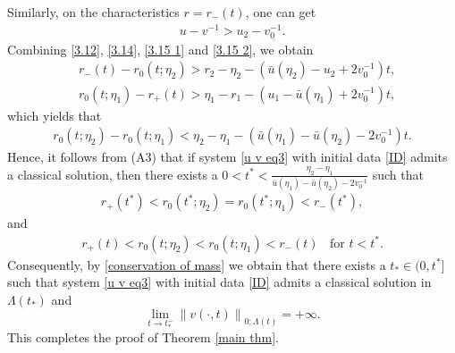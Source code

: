 \documentclass[10pt,leqno]{amsart}
\numberwithin{equation}{section}
\begin{document}
	Similarly, on the characteristics $r=r_{-}(t)$, one can get
	\begin{equation} \label{3.15 2}
		\begin{aligned}
			u-v^{-1}>u_2-v^{-1}_0.			 
		\end{aligned}
	\end{equation}
	Combining \eqref{3.12}, \eqref{3.14}, \eqref{3.15 1} and \eqref{3.15 2}, we obtain
	\begin{equation} 
		\begin{aligned}
			& r_{-}(t) - r_{0}(t;\eta_2) > r_{2}-\eta_2-( \bar{u} (\eta_2) - u_2 + 2v^{-1}_{0} ) t, \\
			& r_{0}(t;\eta_1)-r_{+}(t) > \eta_1-r_{1}-( u_1 - \bar{u} (\eta_1)  + 2v^{-1}_{0} ) t,
		\end{aligned}
	\end{equation}	
	which yields that
	\begin{equation} 
		\begin{aligned}
			r_{0}(t;\eta_2) - r_{0}(t;\eta_1) < \eta_2-\eta_1 - (\bar{u} (\eta_1) - \bar{u} (\eta_2)-2v^{-1}_{0})t .
		\end{aligned}
	\end{equation}	
	Hence, it follows from (A3) that if system \eqref{u v eq3} with initial data \eqref{ID} admits a classical solution, then there exists a $0<t^{*}<\frac{\eta_2-\eta_1 }{\bar{u} (\eta_1) - \bar{u} (\eta_2)-2v^{-1}_{0}}$ such that 
	\begin{equation*} 
		\begin{aligned}
			r_{+}(t^{*}) < r_{0}(t^{*};\eta_2) = r_{0}(t^{*};\eta_1) < r_{-}(t^{*}),
		\end{aligned}
	\end{equation*}	
	and
	\begin{equation*} 
		\begin{aligned}
			r_{+}(t) < r_{0}(t;\eta_2) < r_{0}(t;\eta_1) < r_{-}(t) \ \ \ \ \text{for } t<t^{*}.
		\end{aligned}
	\end{equation*}	
	Consequently, by \eqref{conservation of mass} we obtain that there exists a $t_{*} \in (0, t^{*}]$ such that system \eqref{u v eq3} with initial data \eqref{ID} admits a classical solution in $\Lambda(t_{*})$ and 
	$$ 	\lim\limits_{t \rightarrow t_{*}^{-}} \left\| v (\cdot,t) \right\|_{0;\Lambda(t)} = + \infty. $$
	This completes the proof of Theorem \ref{main thm}.
	
\end{document}
